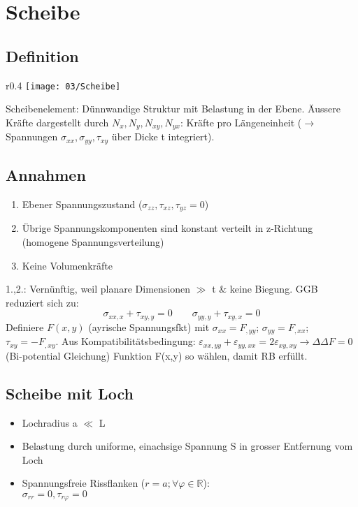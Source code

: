 \section{Scheibe}
    \subsection{Definition}
        \begin{wrapfigure}[5]{r}{0.4\linewidth}
            \vspace{-5mm}
            \texttt{[image: 03/Scheibe]}
        \end{wrapfigure}
        Scheibenelement: Dünnwandige Struktur mit Belastung in der Ebene. Äussere Kräfte dargestellt durch $N_x,N_y,N_{xy},N_{yx}$: Kräfte pro Längeneinheit ($\rightarrow$ Spannungen $\sigma_{xx},\sigma_{yy},\tau_{xy}$ über Dicke t integriert).\\
        
    \subsection{Annahmen}
        \begin{enumerate}[noitemsep]
            \item Ebener Spannungszustand ($\sigma_{zz},\tau_{xz},\tau_{yz}=0$)
            \item Übrige Spannungskomponenten sind konstant verteilt in z-Richtung (homogene Spannungsverteilung)
            \item Keine Volumenkräfte
        \end{enumerate}
        1.,2.: Vernünftig, weil planare Dimensionen $\gg$ t \& keine Biegung. GGB reduziert sich zu:
        \[\sigma_{xx,x} + \tau_{xy,y}=0\quad\quad\sigma_{yy,y} + \tau_{xy,x}=0\]
        Definiere $F(x,y)$ (ayrische Spannungsfkt) mit $\sigma_{xx}=F_{,yy}$; $\sigma_{yy}=F_{,xx}$; $\tau_{xy}=-F_{,xy}$. Aus Kompatibilitätsbedingung: $\varepsilon_{xx,yy}+\varepsilon_{yy,xx}=2\varepsilon_{xy,xy} \rightarrow \Delta\Delta F=0$ (Bi-potential Gleichung) Funktion F(x,y) so wählen, damit RB erfüllt.
        
    \subsection{Scheibe mit Loch}

        \begin{itemize}
            \item Lochradius a $\ll$ L
            \item Belastung durch uniforme, einachsige Spannung S in grosser Entfernung vom Loch
            \item Spannungsfreie Rissflanken ($r = a; \forall\varphi\in\mathbb{R} $):\\ $\sigma_{rr}=0, \tau_{r\varphi}=0$
        \end{itemize}
        
